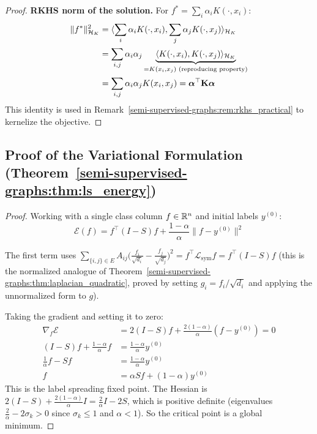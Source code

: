 \begin{notechapter}
\begin{proof}
\textbf{RKHS norm of the solution.} For $f^* = \sum_i \alpha_i K(\cdot, x_i)$:
\begin{align}
\|f^*\|_{\mathcal{H}_K}^2 &=
\langle \sum_i \alpha_i K(\cdot, x_i), \sum_j \alpha_j K(\cdot, x_j) \rangle_{
\mathcal{H}_K} \\
&= \sum_{i,j}\alpha_i\alpha_j \underbrace{\langle K(\cdot, x_i), K(\cdot, x_j) \rangle_{
\mathcal{H}_K}}_{= K(x_i, x_j) \text{ (reproducing property)}} \\
&= \sum_{i,j}\alpha_i\alpha_j K(x_i, x_j) = \boldsymbol{\alpha}^\top
\mathbf{K}\boldsymbol{\alpha}
\end{align}
This identity is used in Remark~\ref{semi-supervised-graphs:rem:rkhs_practical} to kernelize the
objective.
\end{proof}

\subsection{Proof of the Variational Formulation (Theorem~\ref{semi-supervised-graphs:thm:ls_energy})}
\label{semi-supervised-graphs:app:ls_energy}

\begin{proof}
Working with a single class column $f \in \mathbb{R}^n$ and initial labels
$y^{(0)}$:
\begin{equation}
\mathcal{E}(f) = f^\top(I - S)f + \frac{1-\alpha}{\alpha}\|f - y^{(0)}\|^2
\end{equation}

The first term uses $\sum_{\{i,j\}\in E}A_{ij}\bigl(\frac{f_i}{\sqrt{d_i}} -
\frac{f_j}{\sqrt{d_j}}\bigr)^2 = f^\top\mathcal{L}_{\mathrm{sym}}f
= f^\top(I-S)f$ (this is the normalized analogue of
Theorem~\ref{semi-supervised-graphs:thm:laplacian_quadratic}, proved by setting $g_i = f_i/\sqrt{d_i}$
and applying the unnormalized form to $g$).

Taking the gradient and setting it to zero:
\begin{align}
\nabla_f \mathcal{E} &= 2(I - S)f + \frac{2(1-\alpha)}{\alpha}(f - y^{(0)}) = 0\\
(I - S)f + \frac{1-\alpha}{\alpha}f &= \frac{1-\alpha}{\alpha}y^{(0)} \\
\frac{1}{\alpha}f - Sf &= \frac{1-\alpha}{\alpha}y^{(0)} \\
f &= \alpha Sf + (1-\alpha)y^{(0)}
\end{align}
This is the label spreading fixed point. The Hessian is
$2(I - S) + \frac{2(1-\alpha)}{\alpha}I = \frac{2}{\alpha}I - 2S$, which is
positive definite (eigenvalues $\frac{2}{\alpha} - 2\sigma_k > 0$ since
$\sigma_k \leq 1$ and $\alpha < 1$). So the critical point is a global minimum.
\end{proof}


\end{notechapter}
